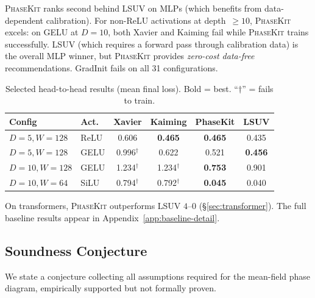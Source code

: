\documentclass[10pt]{article}
\newcommand{\ToolName}{\textsc{PhaseKit}}
\begin{document}
\ToolName{} ranks second behind LSUV on MLPs (which benefits from data-dependent calibration).
For non-ReLU activations at depth~$\geq 10$, \ToolName{} excels: on GELU at $D=10$, both Xavier and Kaiming fail while \ToolName{} trains successfully.
LSUV (which requires a forward pass through calibration data) is the overall MLP winner, but \ToolName{} provides \emph{zero-cost data-free} recommendations.
GradInit fails on all 31 configurations.

\begin{table}[t]
\centering
\caption{Selected head-to-head results (mean final loss). Bold = best. ``$\dagger$'' = fails to train.}
\label{tab:baseline-comparison}
\small
\begin{tabular}{@{}llcccc@{}}
\toprule
\textbf{Config} & \textbf{Act.} & \textbf{Xavier} & \textbf{Kaiming} & \textbf{PhaseKit} & \textbf{LSUV} \\
\midrule
$D\!=\!5, W\!=\!128$  & ReLU & 0.606 & \textbf{0.465} & \textbf{0.465} & 0.435 \\
$D\!=\!5, W\!=\!128$  & GELU & 0.996$^\dagger$ & 0.622 & 0.521 & \textbf{0.456} \\
$D\!=\!10, W\!=\!128$ & GELU & 1.234$^\dagger$ & 1.234$^\dagger$ & \textbf{0.753} & 0.901 \\
$D\!=\!10, W\!=\!64$  & SiLU & 0.794$^\dagger$ & 0.792$^\dagger$ & \textbf{0.045} & 0.040 \\
\bottomrule
\end{tabular}
\end{table}

On transformers, \ToolName{} outperforms LSUV $4$--$0$ (\S\ref{sec:transformer}).
The full baseline results appear in Appendix~\ref{app:baseline-detail}.

\subsection{Soundness Conjecture}
\label{sec:soundness}

We state a conjecture collecting all assumptions required for the mean-field phase diagram, empirically supported but not formally proven.
\end{document}
